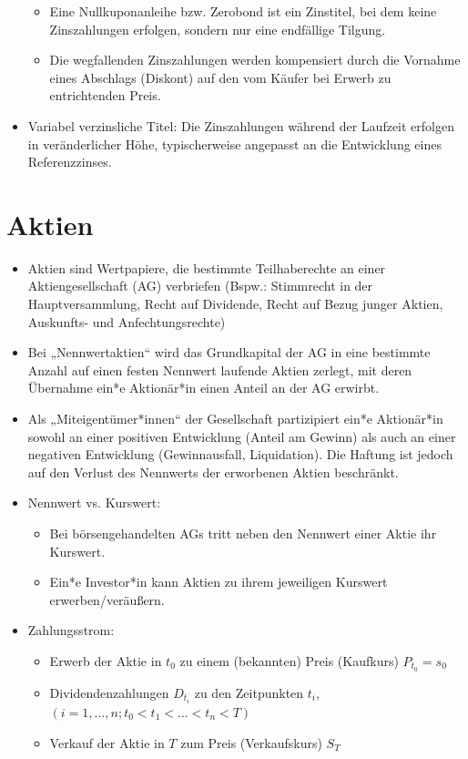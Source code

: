 \documentclass[12pt]{report}
\theoremstyle{dotless}
\theoremstyle{definition}
\begin{document}
\begin{itemize}
\begin{itemize}
\item Eine Nullkuponanleihe bzw. Zerobond ist ein Zinstitel, bei dem keine
Zinszahlungen erfolgen, sondern nur eine endfällige Tilgung.
\item Die wegfallenden Zinszahlungen werden kompensiert durch die Vornahme eines
Abschlags (Diskont) auf den vom Käufer bei Erwerb zu entrichtenden Preis.
\end{itemize}
\item Variabel verzinsliche Titel: Die Zinszahlungen während der Laufzeit erfolgen in veränderlicher Höhe, typischerweise angepasst an die Entwicklung eines Referenzzinses.
\end{itemize}


\section{Aktien}

\begin{itemize}
\item Aktien sind Wertpapiere, die bestimmte Teilhaberechte an einer Aktiengesellschaft (AG) verbriefen (Bspw.: Stimmrecht in der Hauptversammlung, Recht auf Dividende, Recht auf Bezug junger Aktien, Auskunfts- und Anfechtungsrechte)
\item Bei „Nennwertaktien“ wird das Grundkapital der AG
in eine bestimmte Anzahl auf einen festen Nennwert laufende Aktien zerlegt,
mit deren Übernahme ein*e Aktionär*in einen Anteil an der AG erwirbt.
\item Als „Miteigentümer*innen“ der Gesellschaft partizipiert ein*e Aktionär*in
sowohl an einer positiven Entwicklung (Anteil am Gewinn) als auch an einer
negativen Entwicklung (Gewinnausfall, Liquidation). Die Haftung ist jedoch
auf den Verlust des Nennwerts der erworbenen Aktien beschränkt.
\item Nennwert vs. Kurswert:
\begin{itemize}
\item Bei börsengehandelten AGs tritt neben den Nennwert einer Aktie ihr Kurswert.
\item Ein*e Investor*in kann Aktien zu ihrem jeweiligen Kurswert
erwerben/veräußern.
\end{itemize}
\item Zahlungsstrom:
\begin{itemize}
\item Erwerb der Aktie in $t_0$ zu einem (bekannten) Preis (Kaufkurs) $P_{t_0} = s_0$
\item Dividendenzahlungen $D_{t_i}$ zu den Zeitpunkten $t_i$, $(i = 1, ..., n; t_0 < t_1 <... < t_n < T)$
\item Verkauf der Aktie in $T$ zum Preis (Verkaufskurs) $S_T$
\end{itemize}
\end{itemize}
\end{document}
